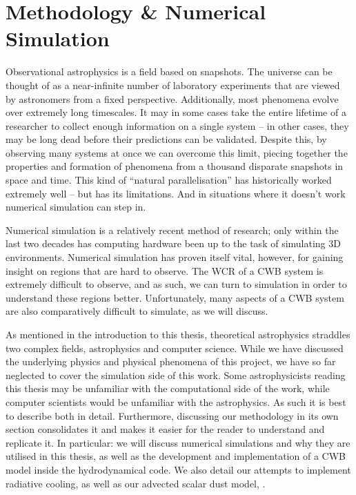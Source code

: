 \chapter{Methodology \& Numerical Simulation}
\label{ch:numsim}

Observational astrophysics is a field based on snapshots.
The universe can be thought of as a near-infinite number of laboratory experiments that are viewed by astronomers from a fixed perspective.
Additionally, most phenomena evolve over extremely long timescales.
It may in some cases take the entire lifetime of a researcher to collect enough information on a single system -- in other cases, they may be long dead before their predictions can be validated.
Despite this, by observing many systems at once we can overcome this limit, piecing together the properties and formation of phenomena from a thousand disparate snapshots in space and time.
This kind of ``natural parallelisation'' has historically worked extremely well -- but has its limitations.
And in situations where it doesn't work numerical simulation can step in.

Numerical simulation is a relatively recent method of research; only within the last two decades has computing hardware been up to the task of simulating 3D environments.
Numerical simulation has proven itself vital, however, for gaining insight on regions that are hard to observe.
The WCR of a CWB system is extremely difficult to observe, and as such, we can turn to simulation in order to understand these regions better.
Unfortunately, many aspects of a CWB system are also comparatively difficult to simulate, as we will discuss.

As mentioned in the introduction to this thesis, theoretical astrophysics straddles two complex fields, astrophysics and computer science.
While we have discussed the underlying physics and physical phenomena of this project, we have so far neglected to cover the simulation side of this work.
Some astrophysicists reading this thesis may be unfamiliar with the computational side of the work, while computer scientists would be unfamiliar with the astrophysics.
As such it is best to describe both in detail.
Furthermore, discussing our methodology in its own section consolidates it and makes it easier for the reader to understand and replicate it.
In particular: we will discuss numerical simulations and why they are utilised in this thesis, as well as the development and implementation of a CWB model inside the \athena{} hydrodynamical code.
We also detail our attempts to implement radiative cooling, as well as our advected scalar dust model, \bidmas.

